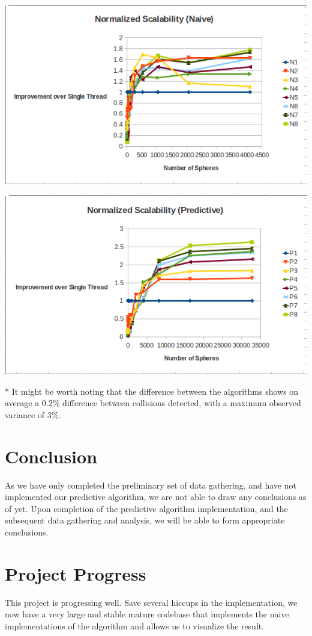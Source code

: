 \documentclass[conference]{IEEEtran}
\begin{document}
\begin{center}
	\includegraphics[width=.45\textwidth]{normalized_scalability_naive.png}
\end{center}

\begin{center}
	\includegraphics[width=.45\textwidth]{normalized_scalability_predictive.png}
\end{center}

* It might be worth noting that the difference between the algorithms shows on average a 0.2\% difference between collisions detected, with a maximum observed variance of 3\%.

\section{Conclusion} 


As we have only completed the preliminary set of data gathering, and have not implemented our predictive algorithm, we are not able to draw any conclusions as of yet.  Upon completion of the predictive algorithm implementation, and the subsequent data gathering and analysis, we will be able to form appropriate conclusions.




\appendix %
\section{Project Progress}
This project is progressing well.  Save several hiccups in the implementation, we now have a very large and stable mature codebase that implements the naive implementations of the algorithm and allows
us to visualize the result.
\end{document}
